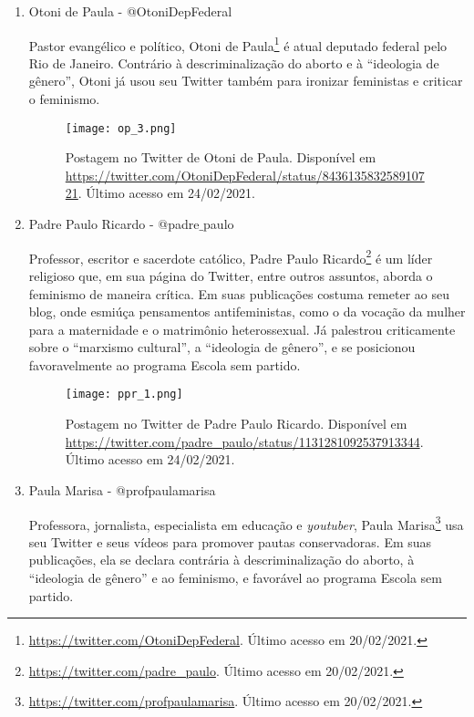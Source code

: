 \documentclass[
	12pt,				%
	openright,			%
	twoside,			%
	a4paper,			%
	english,			%
	brazil				%
	]{abntex2}
\begin{document}
\begin{anexosenv}
\begin{enumerate}
 \item Otoni de Paula - @OtoniDepFederal
 
 Pastor evangélico e político, Otoni de Paula\footnote{\url{https://twitter.com/OtoniDepFederal}. Último acesso em 20/02/2021.} é atual deputado federal pelo Rio de Janeiro. Contrário à descriminalização do aborto e à ``ideologia de gênero'', Otoni já usou seu Twitter também para ironizar feministas e criticar o feminismo.
 
 \begin{figure}[!htbp]
    \centering
    \texttt{[image: op\_3.png]}
    \caption{Postagem no Twitter de Otoni de Paula. Disponível em \url{https://twitter.com/OtoniDepFederal/status/843613583258910721}. Último acesso em 24/02/2021.}
 \end{figure}
 
 \newpage
  
 \item Padre Paulo Ricardo - @padre$\_$paulo
 
 Professor, escritor e sacerdote católico, Padre Paulo Ricardo\footnote{\url{https://twitter.com/padre_paulo}. Último acesso em 20/02/2021.} é um líder religioso que, em sua página do Twitter, entre outros assuntos, aborda o feminismo de maneira crítica. Em suas publicações costuma remeter ao seu blog, onde esmiúça pensamentos antifeministas, como o da vocação da mulher para a maternidade e o matrimônio heterossexual. Já palestrou criticamente sobre o ``marxismo cultural'', a ``ideologia de gênero'', e se posicionou favoravelmente ao programa Escola sem partido.
 
 \begin{figure}[!htbp]
    \centering
    \texttt{[image: ppr\_1.png]}
    \caption{Postagem no Twitter de Padre Paulo Ricardo. Disponível em \url{https://twitter.com/padre_paulo/status/1131281092537913344}. Último acesso em 24/02/2021.}
 \end{figure}
  
  \newpage
  
 \item Paula Marisa - @profpaulamarisa
 
 Professora, jornalista, especialista em educação e \textit{youtuber}, Paula Marisa\footnote{\url{https://twitter.com/profpaulamarisa}. Último acesso em 20/02/2021.} usa seu Twitter e seus vídeos para promover pautas conservadoras. Em suas publicações, ela se declara contrária à descriminalização do aborto, à ``ideologia de gênero'' e ao feminismo, e favorável ao programa Escola sem partido.
 

\end{enumerate}
\end{anexosenv}
\end{document}
